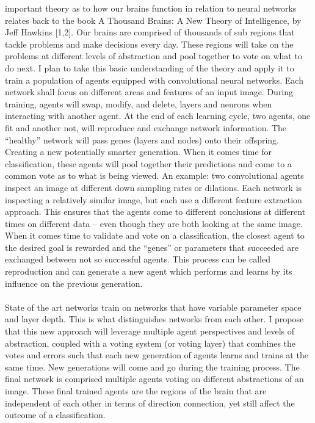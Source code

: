 \documentclass[journal]{IEEEtai}
\begin{document}
 important theory as to how our brains function in relation to neural networks relates back to the book A Thousand Brains: A New Theory of Intelligence, by Jeff Hawkins [1,2]. Our brains are comprised of thousands of sub regions that tackle problems and make decisions every day. These regions will take on the problems at different levels of abstraction and pool together to vote on what to do next. I plan to take this basic understanding of the theory and apply it to train a population of agents equipped with convolutional neural networks. Each network shall focus on different areas and features of an input image. During training, agents will swap, modify, and delete, layers and neurons when interacting with another agent. At the end of each learning cycle, two agents, one fit and another not, will reproduce and exchange network information. The “healthy” network will pass genes  (layers and nodes) onto their offspring. Creating a new potentially smarter generation. When it comes time for classification, these agents will pool together their predictions and come to a common vote as to what is being viewed. An example: two convolutional agents inspect an image at different down sampling rates or dilations. Each network is inspecting a relatively similar image, but each use a different feature extraction approach. This ensures that the agents come to different conclusions at different times on different data – even though they are both looking at the same image. When it comes time to validate and vote on a classification, the closest agent to the desired goal is rewarded and the “genes” or parameters that succeeded are exchanged between not so successful agents. This process can be called reproduction and can generate a new agent which performs and learns by its influence on the previous generation.\\ \\
State of the art networks train on networks that have variable parameter space and layer depth. This is what distinguishes networks from each other. I propose that this new approach will leverage multiple agent perspectives and levels of abstraction, coupled with a voting system (or voting layer) that combines the votes and errors such that each new generation of agents learns and trains at the same time. New generations will come and go during the training process. The final network is comprised multiple agents voting on different abstractions of an image. These final trained agents are the regions of the brain that are independent of each other in terms of direction connection, yet still affect the outcome of a classification.
\end{document}
